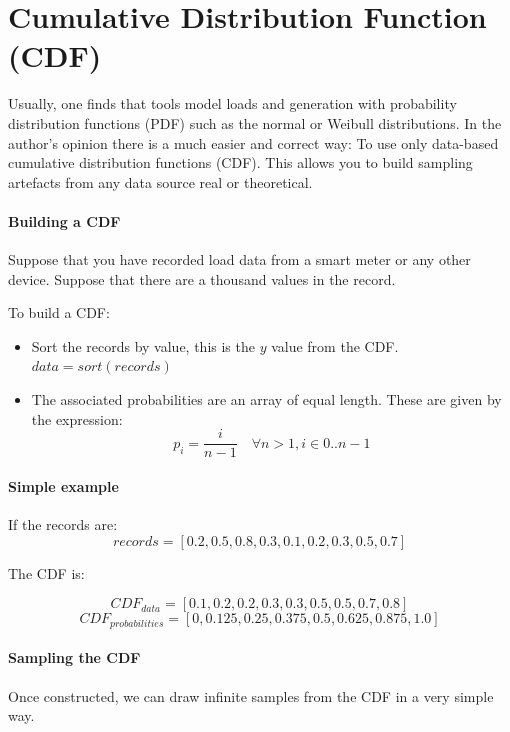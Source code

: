 \documentclass[nols,a4paper,twoside,notoc,fleqn]{tufte-book}
\begin{document}
\section{Cumulative Distribution Function (CDF)}

Usually, one finds that tools model loads and generation with probability distribution functions (PDF) such as the normal or Weibull distributions. In the author's opinion there is a much easier and correct way: To use only data-based cumulative distribution functions (CDF). This allows you to build sampling artefacts from any data source real or theoretical.

\paragraph{Building a CDF}

Suppose that you have recorded load data from a smart meter or any other device. Suppose that there are a thousand values in the record.

To build a CDF:

\begin{itemize}
	\item Sort the records by value, this is the $y$ value from the CDF. $data = sort(records)$
	\item The associated probabilities are an array of equal length. These are given by the expression: $$p_i = \frac{i}{n-1} \quad \forall n > 1, i \in {0..n-1}$$
\end{itemize}

\paragraph{Simple example}

If the records are:
$$
records = [0.2, 0.5, 0.8, 0.3, 0.1, 0.2, 0.3, 0.5, 0.7]
$$

The CDF is:

$$
CDF_{data} = [0.1, 0.2, 0.2, 0.3, 0.3, 0.5, 0.5, 0.7, 0.8]
$$
$$
CDF_{probabilities} = [0, 0.125, 0.25, 0.375, 0.5, 0.625, 0.875, 1.0]
$$

\paragraph{Sampling the CDF}

Once constructed, we can draw infinite samples from the CDF in a very simple way.
\end{document}
